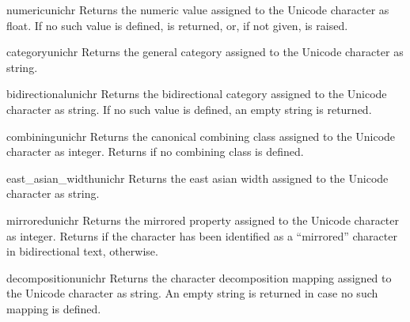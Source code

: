 \begin{funcdesc}{numeric}{unichr}
  Returns the numeric value assigned to the Unicode character
   as float. If no such value is defined,  is
  returned, or, if not given,  is raised.
\end{funcdesc}

\begin{funcdesc}{category}{unichr}
  Returns the general category assigned to the Unicode character
   as string.
\end{funcdesc}

\begin{funcdesc}{bidirectional}{unichr}
  Returns the bidirectional category assigned to the Unicode character
   as string. If no such value is defined, an empty string
  is returned.
\end{funcdesc}

\begin{funcdesc}{combining}{unichr}
  Returns the canonical combining class assigned to the Unicode
  character  as integer. Returns  if no combining
  class is defined.
\end{funcdesc}

\begin{funcdesc}{east_asian_width}{unichr}
  Returns the east asian width assigned to the Unicode character
   as string.
\end{funcdesc}

\begin{funcdesc}{mirrored}{unichr}
  Returns the mirrored property assigned to the Unicode character
   as integer. Returns  if the character has been
  identified as a ``mirrored'' character in bidirectional text,
   otherwise.
\end{funcdesc}

\begin{funcdesc}{decomposition}{unichr}
  Returns the character decomposition mapping assigned to the Unicode
  character  as string. An empty string is returned in case
  no such mapping is defined.
\end{funcdesc}

